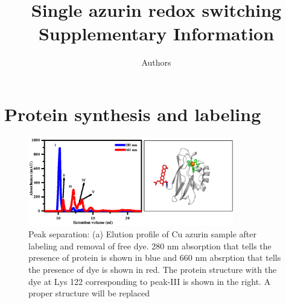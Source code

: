 \documentclass[11pt,a4paper,onecolumn]{article}
\newcommand*{\affaddr}[1]{#1} %
\newcommand*{\email}[1]{\texttt{#1}} %
\begin{document}
\author{Authors
}

\date{\vspace{1ex}} %

\title{\textbf{Single azurin redox switching}\\ \vspace{3ex} Supplementary Information \vspace{3ex}}

\maketitle
\tableofcontents
\pagebreak
\section{Protein synthesis and labeling}
\begin{figure}
  \centering
  \includegraphics[width=0.8\textwidth]{peak_separation.eps}
  \makeatletter
  \renewcommand{\fnum@figure}{\figurename~S\thefigure}
  \makeatother
  \caption{Peak separation: (a) Elution profile of Cu azurin sample after labeling and removal of free dye. 280 nm absorption that tells the presence of protein is shown in blue and 660 nm absrption that tells the presence of dye is shown in red. The protein structure with the dye at Lys 122 corresponding to peak-III is shown in the right. {A proper structure will be replaced}}
  \label{SIfig: peak_sep}
\end{figure}
\pagebreak
\end{document}
